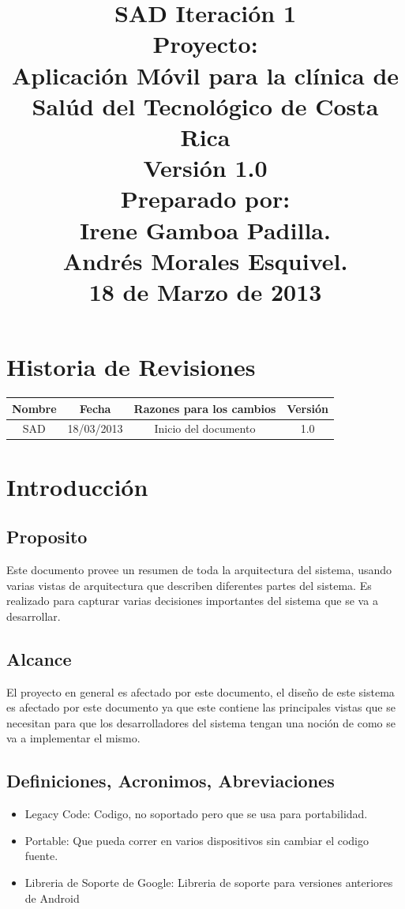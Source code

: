 \documentclass[12pt]{article}
\title{\begin{flushright}\textbf{SAD Iteraci\'on 1} \\[0.7in] 
		Proyecto: \\[0.2in]
		\textbf{Aplicaci\'on M\'ovil para la cl\'inica de Sal\'ud del Tecnol\'ogico de Costa Rica}\\[0.7in]
		Versi\'on 1.0 \\[0.7in]
		Preparado por: \\[0.2in]
		\textbf{Irene Gamboa Padilla.\\
		Andr\'es Morales Esquivel.} \\[0.7in]
		18 de Marzo de 2013
		\end{flushright}}
\author{}
\date{}
\begin{document}
\maketitle
\newpage
\renewcommand{\contentsname}{Tabla de Contenido}
{\footnotesize
	\tableofcontents
}
\section{Historia de Revisiones}

\begin{center}
	\begin{tabular}{|c|c|c|c|}
	\hline
		\textbf{Nombre} & \textbf{Fecha} & \textbf{Razones para los cambios} & \textbf{Versi\'on}\\
	\hline
		SAD & 18/03/2013 & Inicio del documento & 1.0\\
	\hline
	\end{tabular}
\end{center}

\newpage
\section{Introducci\'on}

\subsection{Proposito}
Este documento provee un resumen de toda la arquitectura del sistema, usando varias vistas de arquitectura que describen diferentes partes del sistema. Es realizado para capturar varias decisiones importantes del sistema que se va a desarrollar.

\subsection{Alcance}
El proyecto en general es afectado por este documento, el dise\~no de este sistema es afectado por este documento ya que este contiene las principales vistas que se necesitan para que los desarrolladores del sistema tengan una noci\'on de como se va a implementar el mismo.

\subsection{Definiciones, Acronimos, Abreviaciones}
\begin{itemize}
	\item{Legacy Code: Codigo, no soportado pero que se usa para portabilidad.}
	\item{Portable: Que pueda correr en varios dispositivos sin cambiar el codigo fuente.}
	\item{Libreria de Soporte de Google: Libreria de soporte para versiones anteriores de Android}
\end{itemize}
\end{document}
